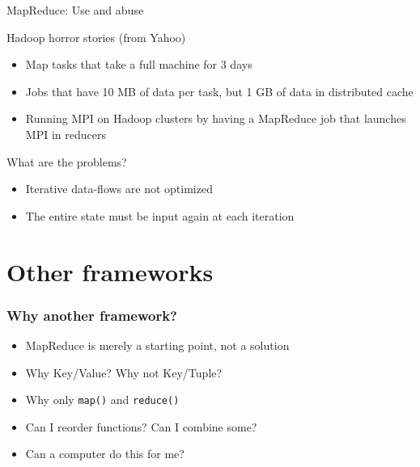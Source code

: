 \begin{frame}{MapReduce: Use and abuse}

Hadoop horror stories (from Yahoo)
\begin{itemize}
\item Map tasks that take a full machine for 3 days
\item Jobs that have 10 MB of data per task, but 1 GB of data in distributed cache
\item Running MPI on Hadoop clusters by having a MapReduce job that launches MPI in reducers
\end{itemize}

\bigskip
What are the problems?
\begin{itemize}
\item Iterative data-flows are not optimized
\item The entire state must be input again at each iteration
\end{itemize}

\end{frame}

% 
% 
% 
% 

\section{Other frameworks}
\begin{frame}
\frametitle{Why another framework?}
\begin{itemize}
\item MapReduce is merely a starting point, not a solution
\item Why Key/Value? Why not Key/Tuple?
\item Why only {\tt map()} and {\tt reduce()}
\item Can I reorder functions? Can I combine some?
\item Can a computer do this for me?
\end{itemize}
\end{frame}

